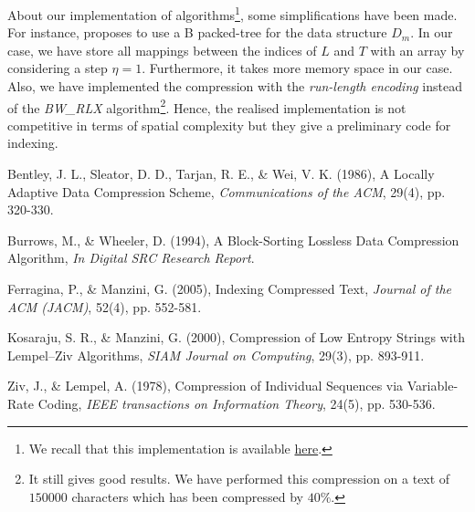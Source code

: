 \documentclass[11pt,twoside]{article}
\theoremstyle{definition}
\begin{document}
About our implementation of algorithms\footnote{We recall that this implementation is available \href{https://github.com/Theo-Roncalli/Text-Indexing}{here}.}, some simplifications have been made. For instance, \citet{Ferragina-2005} proposes to use a B packed-tree for the data structure $D_{m}$. In our case, we have store all mappings between the indices of $L$ and $T$ with an array by considering a step $\eta = 1$. Furthermore, it takes more memory space in our case. Also, we have implemented the compression with the \textit{run-length encoding} instead of the \textit{BW\_RLX} algorithm\footnote{It still gives good results. We have performed this compression on a text of $150000$ characters which has been compressed by $40\%$.}. Hence, the realised implementation is not competitive in terms of spatial complexity but they give a preliminary code for indexing.

\clearpage



\begin{thebibliography}{1}

 Bentley, J. L., Sleator, D. D., Tarjan, R. E., \& Wei, V. K. (1986), A Locally Adaptive Data Compression Scheme, \textit{Communications of the ACM}, 29(4), pp. 320-330.

 Burrows, M., \& Wheeler, D. (1994), A Block-Sorting Lossless Data Compression Algorithm, \textit{In Digital SRC Research Report}.

 Ferragina, P., \& Manzini, G. (2005), Indexing Compressed Text, \textit{Journal of the ACM (JACM)}, 52(4), pp. 552-581.

 Kosaraju, S. R., \& Manzini, G. (2000), Compression of Low Entropy Strings with Lempel--Ziv Algorithms, \textit{SIAM Journal on Computing}, 29(3), pp. 893-911.

 Ziv, J., \& Lempel, A. (1978), Compression of Individual Sequences via Variable-Rate Coding, \textit{IEEE transactions on Information Theory}, 24(5), pp. 530-536.

\end{thebibliography}

\clearpage
\end{document}
